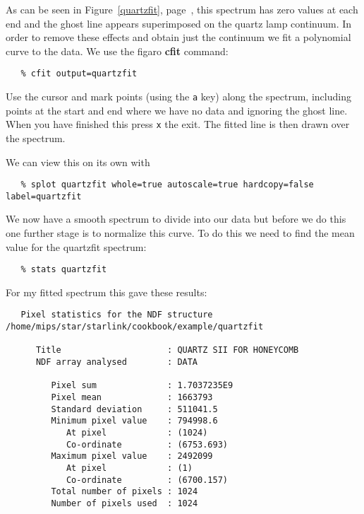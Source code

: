 \documentclass[twoside,11pt]{article}
\newcommand{\xref}[3]{#1}
\newcommand{\scspec}[2]{#1}
\newcommand{\scspec}[2]{#2}
\begin{document}
As can be seen in \scspec{Figure~\ref{quartzfit},
page~\pageref{quartzfit},}{the figure below,} this spectrum has zero
values at each end and the ghost line appears superimposed on the
quartz lamp continuum. In order to remove these effects and obtain
just the continuum we fit a polynomial curve to the data. We use the
\xref{{\sc figaro}}{sun86}{} \xref{{\bf cfit}}{sun86}{CFIT} command:

{\scspec{\small}{ }
\begin{verbatim}
   % cfit output=quartzfit
\end{verbatim}
}

Use the cursor and mark points (using the {\tt a} key) along the
spectrum, including points at the start and end where we have no data
and ignoring the ghost line. When you have finished this press {\tt x}
the exit. The fitted line is then drawn over the spectrum.



We can view this on its own with 

{\scspec{\small}{ }
\begin{verbatim}
   % splot quartzfit whole=true autoscale=true hardcopy=false label=quartzfit
\end{verbatim}
}

We now have a smooth spectrum to divide into our data but before we do
this one further stage is to normalize this curve. To do this we need
to find the mean value for the quartzfit spectrum:

{\scspec{\small}{ }
\begin{verbatim}
   % stats quartzfit
\end{verbatim}
}

For my fitted spectrum this gave these results:

{\scspec{\small}{ }
\begin{verbatim}
   Pixel statistics for the NDF structure
/home/mips/star/starlink/cookbook/example/quartzfit

      Title                     : QUARTZ SII FOR HONEYCOMB
      NDF array analysed        : DATA

         Pixel sum              : 1.7037235E9
         Pixel mean             : 1663793
         Standard deviation     : 511041.5
         Minimum pixel value    : 794998.6
            At pixel            : (1024)
            Co-ordinate         : (6753.693)
         Maximum pixel value    : 2492099
            At pixel            : (1)
            Co-ordinate         : (6700.157)
         Total number of pixels : 1024
         Number of pixels used  : 1024 
\end{verbatim}
}
\end{document}
